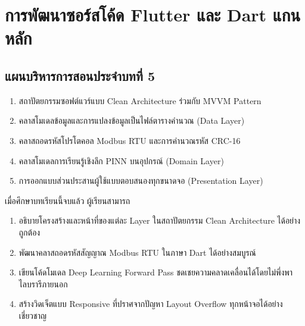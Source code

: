 \chapter{การพัฒนาซอร์สโค้ด Flutter และ Dart แกนหลัก}
\label{chap:ch05}

\section*{แผนบริหารการสอนประจำบทที่ 5}

\begin{tcolorbox}[
    enhanced, breakable,
    colback=white, colframe=rbruNavy,
    fonttitle=\bfseries\color{white},
    title={1. หัวข้อเนื้อหาประจำบท},
    arc=1.5mm, boxrule=0.8pt, leftrule=3.5mm
]
\begin{enumerate}
    \item สถาปัตยกรรมซอฟต์แวร์แบบ Clean Architecture ร่วมกับ MVVM Pattern
    \item คลาสโมเดลข้อมูลและการแปลงข้อมูลเป็นไฟล์ตารางคำนวณ (Data Layer)
    \item คลาสถอดรหัสโปรโตคอล Modbus RTU และการคำนวณรหัส CRC-16
    \item คลาสโมเดลการเรียนรู้เชิงลึก PINN บนอุปกรณ์ (Domain Layer)
    \item การออกแบบส่วนประสานผู้ใช้แบบตอบสนองทุกขนาดจอ (Presentation Layer)
\end{enumerate}
\end{tcolorbox}

\begin{tcolorbox}[
    enhanced, breakable,
    colback=white, colframe=rbruNavy,
    fonttitle=\bfseries\color{white},
    title={2. วัตถุประสงค์เชิงพฤติกรรม},
    arc=1.5mm, boxrule=0.8pt, leftrule=3.5mm
]
เมื่อศึกษาบทเรียนนี้จบแล้ว ผู้เรียนสามารถ
\begin{enumerate}
    \item อธิบายโครงสร้างและหน้าที่ของแต่ละ Layer ในสถาปัตยกรรม Clean Architecture ได้อย่างถูกต้อง
    \item พัฒนาคลาสถอดรหัสสัญญาณ Modbus RTU ในภาษา Dart ได้อย่างสมบูรณ์
    \item เขียนโค้ดโมเดล Deep Learning Forward Pass ชดเชยความคลาดเคลื่อนได้โดยไม่พึ่งพาไลบรารีภายนอก
    \item สร้างวิดเจ็ตแบบ Responsive ที่ปราศจากปัญหา Layout Overflow ทุกหน้าจอได้อย่างเชี่ยวชาญ
\end{enumerate}
\end{tcolorbox}

